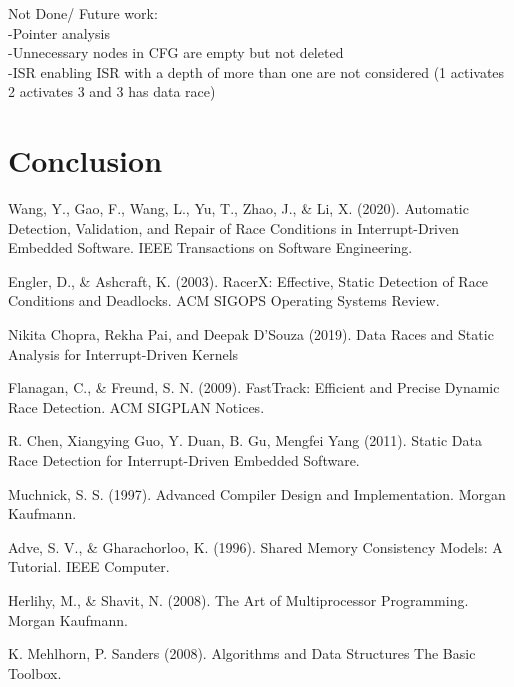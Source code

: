 \documentclass[
fancyheadings, %
%
%
]{stsreprt}
\begin{document}
{		
		Not Done/ Future work:\\
		-Pointer analysis\\
		-Unnecessary nodes in CFG are empty but not deleted\\
		-ISR enabling ISR with a depth of more than one are not considered (1 activates 2 activates 3 and 3 has data race)\\
		\chapter{Conclusion}
		
		\appendix
	}
	\backmatter{}
	\begin{thebibliography}{9}
		Wang, Y., Gao, F., Wang, L., Yu, T., Zhao, J., \& Li, X. (2020). Automatic Detection, Validation, and Repair of Race Conditions in Interrupt-Driven Embedded Software. IEEE Transactions on Software Engineering.
		
		Engler, D., \& Ashcraft, K. (2003). RacerX: Effective, Static Detection of Race Conditions and Deadlocks. ACM SIGOPS Operating Systems Review.
		
		Nikita Chopra, Rekha Pai, and Deepak D’Souza (2019). Data Races and Static Analysis for Interrupt-Driven Kernels
		
		Flanagan, C., \& Freund, S. N. (2009). FastTrack: Efficient and Precise Dynamic Race Detection. ACM SIGPLAN Notices.
		
		R. Chen, Xiangying Guo, Y. Duan, B. Gu, Mengfei Yang (2011). Static Data Race Detection for Interrupt-Driven Embedded Software.
		
		Muchnick, S. S. (1997). Advanced Compiler Design and Implementation. Morgan Kaufmann.
		
		Adve, S. V., \& Gharachorloo, K. (1996). Shared Memory Consistency Models: A Tutorial. IEEE Computer.
		
		Herlihy, M., \& Shavit, N. (2008). The Art of Multiprocessor Programming. Morgan Kaufmann.
		
		K. Mehlhorn, P. Sanders (2008). Algorithms and Data Structures The Basic Toolbox.
	\end{thebibliography}
\end{document}
